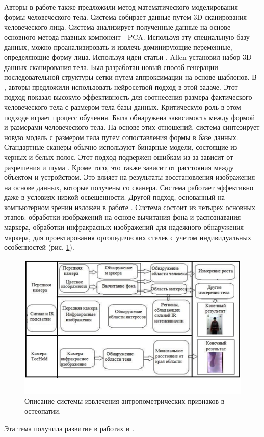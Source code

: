 Авторы в работе \cite{Blanz1999} также предложили метод математического моделирования формы человеческого тела. Система собирает данные путем 3D сканирования человеческого лица. Система анализирует полученные данные на основе основного метода главных компонент - PCA. Используя эту специальную базу данных, можно проанализировать и извлечь доминирующие переменные, определяющие форму лица. Используя идеи статьи \cite{Blanz1999}, Allen \cite{Allen2003} установил набор 3D данных сканирования тела. Был разработан новый способ генерации последовательной структуры сетки путем аппроксимации на основе шаблонов. В \cite{Seo2003}, \cite{Seo2004} авторы предложили использовать нейросетвой подход в этой задаче. Этот подход показал высокую эффективность для соотнесения размера фактического человеческого тела с размером тела базы данных. Критическую роль в этом подходе играет процесс обучения. Была обнаружена зависимость между формой и размерами человеческого тела. На основе этих отношений, система синтезирует новую модель с размером тела путем сопоставления формы в базе данных. Стандартные сканеры обычно используют бинарные модели, состоящие из черных и белых полос.  Этот подход подвержен ошибкам из-за зависит от разрешения и шума \cite{Rocchini2001}. Кроме того, это также зависит от расстояния между объектом и устройством. Это влияет на результаты восстановления изображения на основе данных, которые получены со сканера. Система работает эффективно даже в условиях низкой освещенности. Другой подход, основанный на компьютерном зрении изложен в работе \cite{Taeyoung2015}. Система состоит из четырех основных этапов: обработки изображений на основе вычитания фона и распознавания маркера, обработки инфракрасных изображений для надежного обнаружения маркера, для проектирования ортопедических стелек с учетом индивидуальных особенностей (рис. \ref{img5}).

\begin{figure}[ht!]
\centering
\includegraphics [scale=0.8] {images/h5.png}
\begin{center}
\caption{Описание системы извлечения антропометрических признаков в остеопатии\cite{Taeyoung2015}.} \label{img5}
\end{center}
\end{figure}

Эта тема получила развитие в работах \cite{McCulloch1988} и \cite{Lee2000}.
